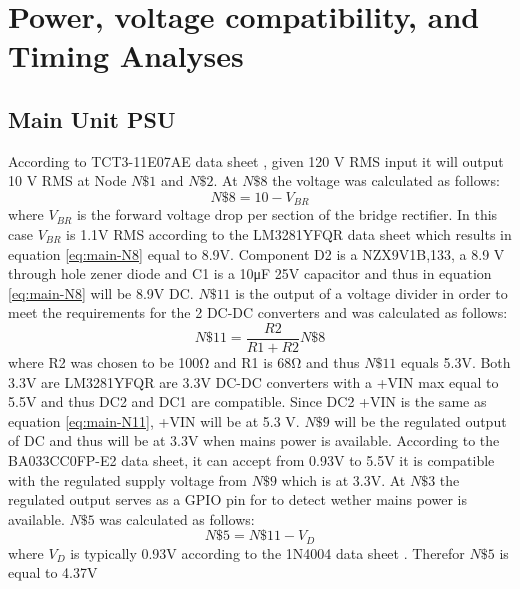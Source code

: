 \section{Power, voltage compatibility, and Timing Analyses}
\subsection{Main Unit PSU}
According to TCT3-11E07AE data sheet \cite{TCT311E07AETriadMagnetics}, given 120 V RMS input it will output 10 V RMS at Node $N\$1$ and $N\$2$. At $N\$8$ the voltage was calculated as follows:
\begin{equation}
  N\$8 = 10 - V_{BR}
  \label{eq:main-N8}
\end{equation}
where $V_{BR}$ is the forward voltage drop per section of the bridge rectifier. In this case $V_{BR}$ is \num{1.1}\si{\V} RMS according to the LM3281YFQR data sheet \cite{LM3281YFQR} which results in equation \ref{eq:main-N8} equal to 8.9\si{\V}. Component D2 is a NZX9V1B,133, a 8.9 V through hole zener diode and C1 is a 10\si{\micro\farad} 25V capacitor and thus in equation \ref{eq:main-N8} will be 8.9\si{\V} DC. $N\$11$ is the output of a voltage divider in order to meet the requirements for the 2 DC-DC converters and was calculated as follows:
\begin{equation}
  N\$11 = \frac{R2}{R1+R2}N\$8
  \label{eq:main-N11}
\end{equation}
where R2 was chosen to be 100\si{\ohm} and R1 is 68\si{\ohm} and thus $N\$11$ equals 5.3\si{\V}. Both 3.3\si{\V} are LM3281YFQR \cite{LM3281YFQR} are 3.3\si{\V} DC-DC converters with a +VIN max equal to 5.5\si{\V} and thus DC2 and DC1 are compatible. Since DC2 +VIN is the same as equation \ref{eq:main-N11}, +VIN will be at 5.3 V. $N\$9$ will be the regulated output of DC and thus will be at 3.3V when mains power is available. According to the BA033CC0FP-E2 data sheet, \cite{BA033CC0FPE2} it can accept from 0.93\si{\V} to 5.5\si{\V} it is compatible with the regulated supply voltage from $N\$9$ which is at 3.3\si{\V}. At $N\$3$ the regulated output serves as a GPIO pin for to detect wether mains power is available. $N\$5$ was calculated as follows:
\begin{equation}
  N\$5 =  N\$11 - V_{D}
  \label{eq:main-N5}
\end{equation}
where $V_{D}$ is typically 0.93\si{\V} according to the 1N4004 data sheet \cite{1N4004RLG}. Therefor $N\$5$ is equal to 4.37\si{\V}
